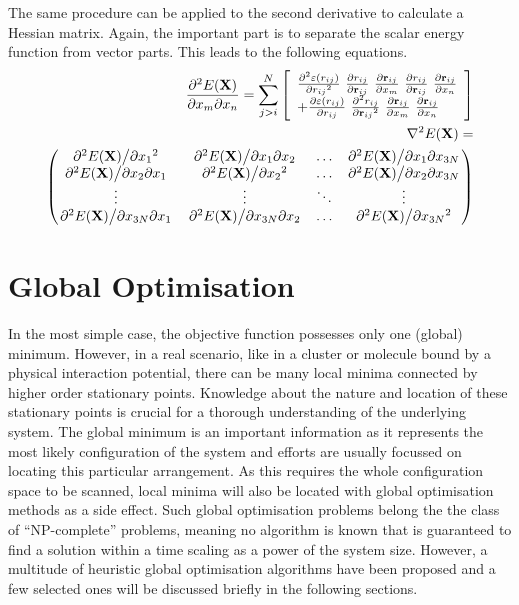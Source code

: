 The same procedure can be applied to the second derivative to calculate a
Hessian matrix. Again, the important part is to separate the scalar energy
function from vector parts. This leads to the following equations.
%
\begin{align}
    \pdv{E(\mathbf{X})}{x_m}{x_n}=\sum_{j>i}^N\left[  
    \begin{array}{ll}
    \pdv[2]{\varepsilon(r_{ij})}{{r_{ij}}}\  
    \pdv{r_{ij}}{\mathbf{r}_{ij}}\ 
    \pdv{\mathbf{r}_{ij}}{x_m}\ 
    \pdv{r_{ij}}{\mathbf{r}_{ij}}\ 
    \pdv{\mathbf{r}_{ij}}{x_n} \\ 
    +
    \pdv{\varepsilon(r_{ij})}{r_{ij}}\
        \pdv[2]{r_{ij}}{{\mathbf{r}_{ij}}}\ 
    \pdv{\mathbf{r}_{ij}}{x_m}\ 
    \pdv{\mathbf{r}_{ij}}{x_n} 
    \end{array}
    \right]\\
    \begin{aligned}
    \nabla^2 E(\mathbf{X})=\\
    \begin{pmatrix}
        \pdv*[2]{E(\mathbf{X})}{{x_1}} & \pdv*{E(\mathbf{X})}{x_1}{x_2} & \ldots & \pdv*{E(\mathbf{X})}{x_1}{x_{3N}}\\
        \pdv*{E(\mathbf{X})}{x_2}{x_1} & \pdv*[2]{E(\mathbf{X})}{{x_2}} & \ldots & \pdv*{E(\mathbf{X})}{x_2}{x_{3N}}\\
        \vdots & \vdots & \ddots & \vdots\\
        \pdv*{E(\mathbf{X})}{x_{3N}}{x_1} & \pdv*{E(\mathbf{X})}{x_{3N}}{x_2} & \ldots & \pdv*[2]{E(\mathbf{X})}{{x_{3N}}}
    \end{pmatrix}
    \end{aligned}
\end{align}

\section{Global Optimisation}
\label{sec:GlobalOptimisation}

In the most simple case, the objective function possesses only one (global)
minimum. However, in a real scenario, like in a cluster or molecule bound by a
physical interaction potential, there can be many local minima connected by
higher order stationary points. Knowledge about the nature and location of these
stationary points is crucial for a thorough understanding of the underlying
system. The global minimum is an important information as it represents the most
likely configuration of the system and efforts are usually focussed on locating
this particular arrangement. As this requires the whole configuration space to
be scanned, local minima will also be located with global optimisation methods
as a side effect. Such global optimisation problems belong the the class of
``NP-complete'' problems, meaning no algorithm is known that is guaranteed to
find a solution within a time scaling as a power of the system size. However, a
multitude of heuristic global optimisation algorithms have been proposed and a
few selected ones will be discussed briefly in the following sections.

